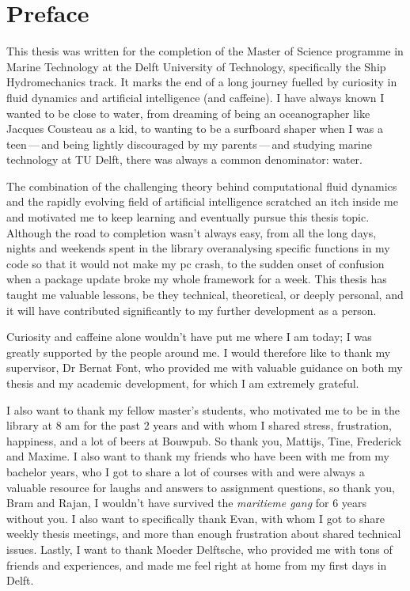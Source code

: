 \chapter*{Preface}




This thesis was written for the completion of the Master of Science programme in Marine Technology at the Delft University of Technology, specifically the Ship Hydromechanics track. It marks the end of a long journey fuelled by curiosity in fluid dynamics and artificial intelligence (and caffeine). I have always known I wanted to be close to water, from dreaming of being an oceanographer like Jacques Cousteau as a kid, to wanting to be a surfboard shaper when I was a teen\,---\,and being lightly discouraged by my parents\,---\,and studying marine technology at TU Delft,  there was always a common denominator: water.

The combination of the challenging theory behind computational fluid dynamics and the rapidly evolving field of artificial intelligence scratched an itch inside me and motivated me to keep learning and eventually pursue this thesis topic. Although the road to completion wasn't always easy, from all the long days, nights and weekends spent in the library overanalysing specific functions in my code so that it would not make my pc crash, to the sudden onset of confusion when a package update broke my whole framework for a week. This thesis has taught me valuable lessons, be they technical, theoretical, or deeply personal, and it will have contributed significantly to my further development as a person. 

Curiosity and caffeine alone wouldn't have put me where I am today; I was greatly supported by the people around me. I would therefore like to thank my supervisor, Dr Bernat Font, who provided me with valuable guidance on both my thesis and my academic development, for which I am extremely grateful. 

I also want to thank my fellow master's students, who motivated me to be in the library at 8 am for the past 2 years and with whom I shared stress, frustration, happiness, and a lot of beers at Bouwpub. So thank you, Mattijs, Tine, Frederick and Maxime. I also want to thank my friends who have been with me from my bachelor years, who I got to share a lot of courses with and were always a valuable resource for laughs and answers to assignment questions, so thank you, Bram and Rajan, I wouldn't have survived the \textit{maritieme gang} for 6 years without you. I also want to specifically thank Evan, with whom I got to share weekly thesis meetings, and more than enough frustration about shared technical issues. Lastly, I want to thank Moeder Delftsche, who provided me with tons of friends and experiences, and made me feel right at home from my first days in Delft. 


